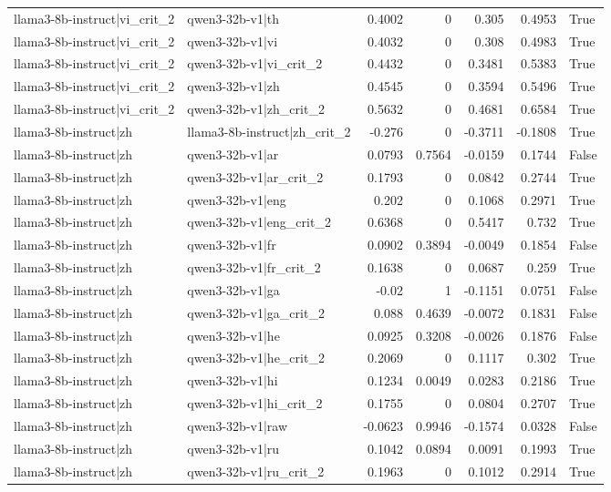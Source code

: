 \begin{table}
\begin{tabular}{l l r r r r l}
llama3-8b-instruct|vi_crit_2 & qwen3-32b-v1|th & 0.4002 & 0 & 0.305 & 0.4953 & True \\
llama3-8b-instruct|vi_crit_2 & qwen3-32b-v1|vi & 0.4032 & 0 & 0.308 & 0.4983 & True \\
llama3-8b-instruct|vi_crit_2 & qwen3-32b-v1|vi_crit_2 & 0.4432 & 0 & 0.3481 & 0.5383 & True \\
llama3-8b-instruct|vi_crit_2 & qwen3-32b-v1|zh & 0.4545 & 0 & 0.3594 & 0.5496 & True \\
llama3-8b-instruct|vi_crit_2 & qwen3-32b-v1|zh_crit_2 & 0.5632 & 0 & 0.4681 & 0.6584 & True \\
llama3-8b-instruct|zh & llama3-8b-instruct|zh_crit_2 & -0.276 & 0 & -0.3711 & -0.1808 & True \\
llama3-8b-instruct|zh & qwen3-32b-v1|ar & 0.0793 & 0.7564 & -0.0159 & 0.1744 & False \\
llama3-8b-instruct|zh & qwen3-32b-v1|ar_crit_2 & 0.1793 & 0 & 0.0842 & 0.2744 & True \\
llama3-8b-instruct|zh & qwen3-32b-v1|eng & 0.202 & 0 & 0.1068 & 0.2971 & True \\
llama3-8b-instruct|zh & qwen3-32b-v1|eng_crit_2 & 0.6368 & 0 & 0.5417 & 0.732 & True \\
llama3-8b-instruct|zh & qwen3-32b-v1|fr & 0.0902 & 0.3894 & -0.0049 & 0.1854 & False \\
llama3-8b-instruct|zh & qwen3-32b-v1|fr_crit_2 & 0.1638 & 0 & 0.0687 & 0.259 & True \\
llama3-8b-instruct|zh & qwen3-32b-v1|ga & -0.02 & 1 & -0.1151 & 0.0751 & False \\
llama3-8b-instruct|zh & qwen3-32b-v1|ga_crit_2 & 0.088 & 0.4639 & -0.0072 & 0.1831 & False \\
llama3-8b-instruct|zh & qwen3-32b-v1|he & 0.0925 & 0.3208 & -0.0026 & 0.1876 & False \\
llama3-8b-instruct|zh & qwen3-32b-v1|he_crit_2 & 0.2069 & 0 & 0.1117 & 0.302 & True \\
llama3-8b-instruct|zh & qwen3-32b-v1|hi & 0.1234 & 0.0049 & 0.0283 & 0.2186 & True \\
llama3-8b-instruct|zh & qwen3-32b-v1|hi_crit_2 & 0.1755 & 0 & 0.0804 & 0.2707 & True \\
llama3-8b-instruct|zh & qwen3-32b-v1|raw & -0.0623 & 0.9946 & -0.1574 & 0.0328 & False \\
llama3-8b-instruct|zh & qwen3-32b-v1|ru & 0.1042 & 0.0894 & 0.0091 & 0.1993 & True \\
llama3-8b-instruct|zh & qwen3-32b-v1|ru_crit_2 & 0.1963 & 0 & 0.1012 & 0.2914 & True \\

\end{tabular}
\end{table}
